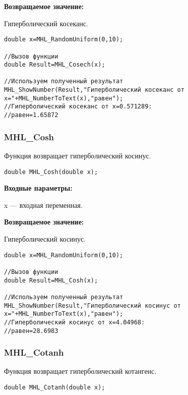 \documentclass[a4paper,12pt]{article}
\begin{document}
\textbf{Возвращаемое значение:}

Гиперболический косеканс.


\begin{lstlisting}[label=code_use_MHL_Cosech,caption=Пример использования]
double x=MHL_RandomUniform(0,10);

//Вызов функции
double Result=MHL_Cosech(x);

//Используем полученный результат
MHL_ShowNumber(Result,"Гиперболический косеканс от x="+MHL_NumberToText(x),"равен");
//Гиперболический косеканс от x=0.571289:
//равен=1.65872
\end{lstlisting}

\subsubsection{MHL\_Cosh}\label{MHL_Cosh}

Функция возвращает гиперболический косинус.


\begin{lstlisting}[label=code_syntax_MHL_Cosh,caption=Синтаксис]
double MHL_Cosh(double x);
\end{lstlisting}

\textbf{Входные параметры:}

 x --- входная переменная.

\textbf{Возвращаемое значение:}

Гиперболический косинус.


\begin{lstlisting}[label=code_use_MHL_Cosh,caption=Пример использования]
double x=MHL_RandomUniform(0,10);

//Вызов функции
double Result=MHL_Cosh(x);

//Используем полученный результат
MHL_ShowNumber(Result,"Гиперболический косинус от x="+MHL_NumberToText(x),"равен");
//Гиперболический косинус от x=4.04968:
//равен=28.6983
\end{lstlisting}

\subsubsection{MHL\_Cotanh}\label{MHL_Cotanh}

Функция возвращает гиперболический котангенс.


\begin{lstlisting}[label=code_syntax_MHL_Cotanh,caption=Синтаксис]
double MHL_Cotanh(double x);
\end{lstlisting}
\end{document}
